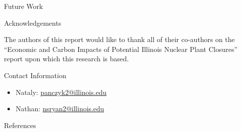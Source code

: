 \documentclass[final]{beamer}
\newlength{\onecolwid}
\newlength{\threecolwid}
\begin{document}
\begin{frame}[t]
\begin{columns}[t,totalwidth=\threecolwid]
\begin{column}{\onecolwid}
\begin{alertblock}{Future Work }
\end{alertblock}




\begin{block}{Acknowledgements}
	
	The authors of this report would like to thank all of their co-authors on the “Economic and Carbon Impacts of Potential Illinois Nuclear Plant Closures” report upon which this research is based.
	
\end{block}



\begin{alertblock}{Contact Information}
	\begin{itemize}
		\item Nataly: \href{mailto:panczyk2@illinois.edu}{panczyk2@illinois.edu}
		\item Nathan: \href{mailto:nsryan2@illinois.edu}{nsryan2@illinois.edu}
	\end{itemize}
	
\end{alertblock}

\begin{block}{References}

	{\footnotesize 
	}
\end{block}





\end{column} %

\end{columns} %

\end{frame} %
\end{document}
